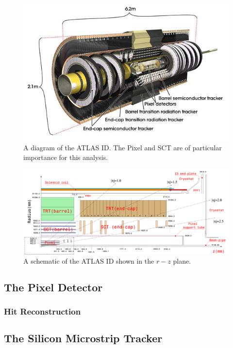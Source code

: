 \begin{figure}[htbp]
\centering
\includegraphics[width=.8\textwidth]{figures/Detector/atlas-ID.jpg}
\caption{A diagram of the \ac{ATLAS} \ac{ID}. The Pixel and \ac{SCT} are of particular importance for this analysis.}
\end{figure}

\begin{figure}[htbp]
\centering
\includegraphics[width=.8\textwidth]{figures/Detector/atlas-id-layers.png}
\caption{A schematic of the \ac{ATLAS} \ac{ID} shown in the $r-z$ plane. }
\label{fig:atlas-id-layers}
\end{figure}

\subsection{The Pixel Detector}
\subsubsection{Hit Reconstruction}
\subsection{The Silicon Microstrip Tracker}

